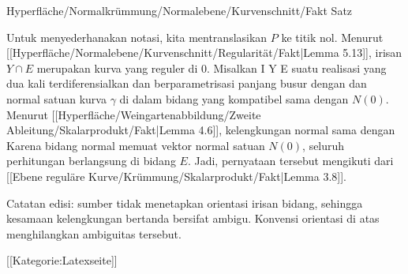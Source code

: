 {Hyperfläche/Normalkrümmung/Normalebene/Kurvenschnitt/Fakt}
{Satz}
{}
{

\faktzusatz {}
\faktzusatz {}

}
{

Untuk menyederhanakan notasi, kita mentranslasikan $P$ ke titik nol. Menurut
[[Hyperfläche/Normalebene/Kurvenschnitt/Regularität/Fakt|Lemma 5.13]],
irisan $Y \cap E$ merupakan kurva yang reguler di $0$. Misalkan
\maabbdisp {\gamma} { I } { Y \cap E
} {}
suatu realisasi yang dua kali terdiferensialkan dan berparametrisasi panjang busur dengan
dan normal satuan kurva $\gamma$ di dalam bidang yang kompatibel sama dengan $N(0)$. Menurut
[[Hyperfläche/Weingartenabbildung/Zweite Ableitung/Skalarprodukt/Fakt|Lemma 4.6]],
kelengkungan normal sama dengan
 Karena bidang normal memuat vektor normal satuan $N(0)$, seluruh perhitungan berlangsung di bidang $E$. Jadi, pernyataan tersebut mengikuti dari
[[Ebene reguläre Kurve/Krümmung/Skalarprodukt/Fakt|Lemma 3.8]].

Catatan edisi: sumber tidak menetapkan orientasi irisan bidang, sehingga kesamaan kelengkungan bertanda bersifat ambigu. Konvensi orientasi di atas menghilangkan ambiguitas tersebut.

}

 [[Kategorie:Latexseite]]
